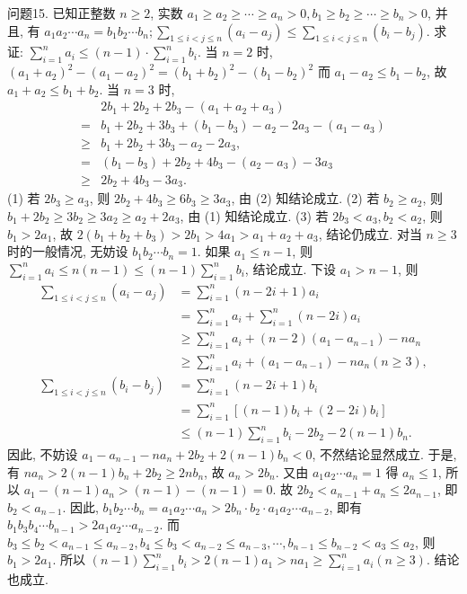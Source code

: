 问题15. 已知正整数 $n \geqslant 2$, 实数 $a_1 \geqslant a_2 \geqslant \cdots \geqslant a_n>0, b_1 \geqslant b_2 \geqslant \cdots \geqslant b_n>0$, 并且, 有 $a_1 a_2 \cdots a_n=b_1 b_2 \cdots b_n ; \sum_{1 \leqslant i<j \leqslant n}\left(a_i-a_j\right) \leqslant \sum_{1 \leqslant i<j \leqslant n}\left(b_i-b_j\right)$. 求证: $\sum_{i=1}^n a_i \leqslant(n-1) \cdot \sum_{i=1}^n b_i$.
当 $n=2$ 时, $\left(a_1+a_2\right)^2-\left(a_1-a_2\right)^2=\left(b_1+b_2\right)^2-\left(b_1-b_2\right)^2$
而 $a_1-a_2 \leqslant b_1-b_2$, 故 $a_1+a_2 \leqslant b_1+b_2$.
当 $n=3$ 时,
$$
\begin{aligned}
& 2 b_1+2 b_2+2 b_3-\left(a_1+a_2+a_3\right) \\
= & b_1+2 b_2+3 b_3+\left(b_1-b_3\right)-a_2-2 a_3-\left(a_1-a_3\right) \\
\geqslant & b_1+2 b_2+3 b_3-a_2-2 a_3, \label{(1)} \\
= & \left(b_1-b_3\right)+2 b_2+4 b_3-\left(a_2-a_3\right)-3 a_3 \\
\geqslant & 2 b_2+4 b_3-3 a_3 . \label{(2)}
\end{aligned}
$$
(1) 若 $2 b_3 \geqslant a_3$, 则 $2 b_2+4 b_3 \geqslant 6 b_3 \geqslant 3 a_3$, 由 (2) 知结论成立.
(2) 若 $b_2 \geqslant a_2$, 则 $b_1+2 b_2 \geqslant 3 b_2 \geqslant 3 a_2 \geqslant a_2+2 a_3$, 由 (1) 知结论成立.
(3) 若 $2 b_3<a_3, b_2<a_2$, 则 $b_1>2 a_1$, 故 $2\left(b_1+b_2+b_3\right)>2 b_1>4 a_1> a_1+a_2+a_3$, 结论仍成立.
对当 $n \geqslant 3$ 时的一般情况, 无妨设 $b_1 b_2 \cdots b_n=1$.
如果 $a_1 \leqslant n-1$, 则 $\sum_{i=1}^n a_i \leqslant n(n-1) \leqslant(n-1) \sum_{i=1}^n b_i$, 结论成立.
下设 $a_1>n-1$, 则
$$
\begin{aligned}
\sum_{1 \leqslant i<j \leqslant n}\left(a_i-a_j\right) & =\sum_{i=1}^n(n-2 i+1) a_i \\
& =\sum_{i=1}^n a_i+\sum_{i=1}^n(n-2 i) a_i \\
& \geqslant \sum_{i=1}^n a_i+(n-2)\left(a_1-a_{n-1}\right)-n a_n \\
& \geqslant \sum_{i=1}^n a_i+\left(a_1-a_{n-1}\right)-n a_n(n \geqslant 3), \\
\sum_{1 \leqslant i<j \leqslant n}\left(b_i-b_j\right) & =\sum_{i=1}^n(n-2 i+1) b_i \\
& =\sum_{i=1}^n\left[(n-1) b_i+(2-2 i) b_i\right] \\
& \leqslant(n-1) \sum_{i=1}^n b_i-2 b_2-2(n-1) b_n .
\end{aligned}
$$
因此, 不妨设 $a_1-a_{n-1}-n a_n+2 b_2+2(n-1) b_n<0$, 不然结论显然成立.
于是, 有 $n a_n>2(n-1) b_n+2 b_2 \geqslant 2 n b_n$, 故 $a_n>2 b_n$. 又由 $a_1 a_2 \cdots a_n=1$
得 $a_n \leqslant 1$, 所以 $a_1-(n-1) a_n>(n-1)-(n-1)=0$. 故 $2 b_2<a_{n-1}+a_n \leqslant 2 a_{n-1}$, 即 $b_2<a_{n-1}$.
因此, $b_1 b_2 \cdots b_n=a_1 a_2 \cdots a_n>2 b_n \cdot b_2 \cdot a_1 a_2 \cdots a_{n-2}$, 即有 $b_1 b_3 b_4 \cdots b_{n-1}>2 a_1 a_2 \cdots a_{n-2}$.
而 $b_3 \leqslant b_2<a_{n-1} \leqslant a_{n-2}, b_4 \leqslant b_3<a_{n-2} \leqslant a_{n-3}, \cdots, b_{n-1} \leqslant b_{n-2}<a_3 \leqslant a_2$, 则 $b_1>2 a_1$.
所以 $(n-1) \sum_{i=1}^n b_i>2(n-1) a_1>n a_1 \geqslant \sum_{i=1}^n a_i(n \geqslant 3)$.
结论也成立.




